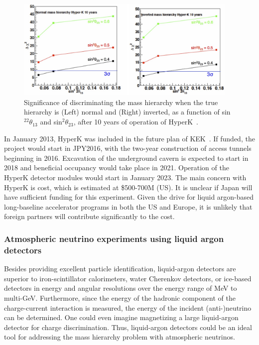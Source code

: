 \begin{figure}[tp]
\begin{center}
\includegraphics[width=0.95\textwidth]{KBL/HyperK_sensitivity.jpg}
\caption{Significance of discriminating the mass hierarchy when the true hierarchy is (Left) normal and (Right) inverted, as a function of sin$^22\theta_{13}$ and sin$^2\theta_{23}$, after 10 years of operation of HyperK~\cite{nonus:HyperK}.}
\label{HyperK:sen}
\end{center}
\end{figure}

In January 2013, HyperK was included in the future plan of
KEK~\cite{atm:Nakaya}. If funded, the project would start in JPY2016,
with the two-year construction of access tunnels beginning in
2016. Excavation of the underground cavern is expected to start in
2018 and beneficial occupancy would take place in 2021. Operation of
the HyperK detector modules would start in January 2023.
The main concern with HyperK is cost, which is estimated at  
\$500-700M (US).  It is unclear if Japan will have sufficient funding for
this experiment.  Given the drive for liquid argon-based long-baseline
accelerator programs in both the US and Europe, it is unlikely that
foreign partners will contribute significantly to the cost.


\subsubsection{Atmospheric neutrino experiments using liquid argon detectors}

Besides providing excellent particle identification, 
liquid-argon detectors are superior to iron-scintillator calorimeters, water Cherenkov
detectors, or ice-based detectors in energy and angular resolutions over the energy
range of MeV to multi-GeV.  
Furthermore, since the energy of the hadronic component of the charge-current
interaction is measured, the energy of the incident (anti-)neutrino can be determined. 
One could even imagine magnetizing a large liquid-argon detector for charge
discrimination. Thus, liquid-argon detectors could be an ideal tool for addressing
the mass hierarchy problem with atmospheric neutrinos. 

